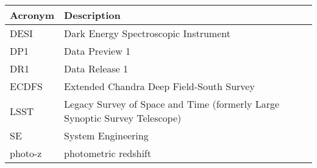 \addtocounter{table}{-1}
\begin{longtable}{p{}p{}}\hline
\textbf{Acronym} & \textbf{Description}  \\\hline

DESI & Dark Energy Spectroscopic Instrument \\\hline
DP1 & Data Preview 1 \\\hline
DR1 & Data Release 1 \\\hline
ECDFS & Extended Chandra Deep Field-South Survey \\\hline
LSST & Legacy Survey of Space and Time (formerly Large Synoptic Survey Telescope) \\\hline
SE & System Engineering \\\hline
photo-z & photometric redshift \\\hline
\end{longtable}
